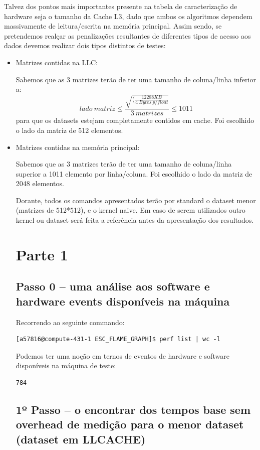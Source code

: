 \documentclass[conference,compsoc]{IEEEtran}
\begin{document}
Talvez dos pontos mais importantes presente na tabela de caracterização de hardware seja o tamanho da Cache L3, dado que ambos os algoritmos dependem massivamente de leitura/escrita na memória principal. Assim sendo, se pretendemos realçar as penalizações resultantes de diferentes tipos de acesso aos dados devemos realizar dois tipos distintos de testes:
\begin{itemize}
\item Matrizes contidas na LLC: \par Sabemos que as 3 matrizes terão de ter uma tamanho de coluna/linha inferior a: \[lado\ matriz \leq \frac{\sqrt{(\frac{12288KB}{4\ Bytes\ p/ float}}}{3\ matrizes} \leq 1011\] para que os datasets estejam completamente contidos em cache. Foi escolhido o lado da matriz de 512 elementos.
\item Matrizes contidas na memória principal: \par 
Sabemos que as 3 matrizes terão de ter uma tamanho de coluna/linha superior a 1011 elemento por linha/coluna. Foi escolhido o lado da matriz de 2048 elementos.\par
Dorante, todos os comandos apresentados terão por standard o dataset menor (matrizes de 512*512), e o kernel naive. Em caso de serem utilizados outro kernel ou dataset será feita a referência antes da apresentação dos resultados.
\section{Parte 1 }

\subsection{Passo 0 -- uma análise aos software e hardware events disponíveis na máquina}
Recorrendo ao seguinte commando:
 \begin{lstlisting}[style=command]
[a57816@compute-431-1 ESC_FLAME_GRAPH]$ perf list | wc -l   
\end{lstlisting}
Podemos ter uma noção em ternos de eventos de hardware e software disponíveis na máquina de teste:
\begin{lstlisting}
784
\end{lstlisting}
   
\subsection{1º Passo -- o encontrar dos tempos base sem overhead de medição para o menor dataset (dataset em LLCACHE)}


\end{itemize}
\end{document}
